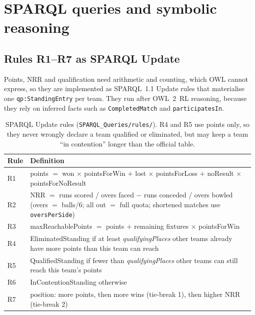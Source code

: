 \section{SPARQL queries and symbolic reasoning}\label{sec:sparql}

\subsection{Rules R1--R7 as SPARQL Update}
Points, NRR and qualification need arithmetic and counting, which OWL cannot express, so they are implemented
as SPARQL~1.1 Update rules \citep{w3c2013sparqlupdate} that materialise one \texttt{qp:StandingEntry} per team.
They run after OWL~2~RL reasoning, because they rely on inferred facts such as \texttt{CompletedMatch} and
\texttt{participatesIn}.

\begin{table}[H]\centering\small
\begin{tabular}{p{1.3cm}p{13.6cm}}
\toprule
\textbf{Rule} & \textbf{Definition} \\ \midrule
R1 & points $=$ won $\times$ pointsForWin $+$ lost $\times$ pointsForLoss $+$ noResult $\times$ pointsForNoResult \\
R2 & NRR $=$ runs scored / overs faced $-$ runs conceded / overs bowled (overs $=$ balls/6; all out $=$ full quota; shortened matches use \texttt{oversPerSide}) \\
R3 & maxReachablePoints $=$ points $+$ remaining fixtures $\times$ pointsForWin \\
R4 & EliminatedStanding if at least \emph{qualifyingPlaces} other teams already have more points than this team can reach \\
R5 & QualifiedStanding if fewer than \emph{qualifyingPlaces} other teams can still reach this team's points \\
R6 & InContentionStanding otherwise \\
R7 & position: more points, then more wins (tie-break 1), then higher NRR (tie-break 2) \\
\bottomrule
\end{tabular}
\caption{SPARQL Update rules (\texttt{SPARQL\_Queries/rules/}). R4 and R5 use points only, so they never
wrongly declare a team qualified or eliminated, but may keep a team ``in contention'' longer than the official
table.}
\end{table}



